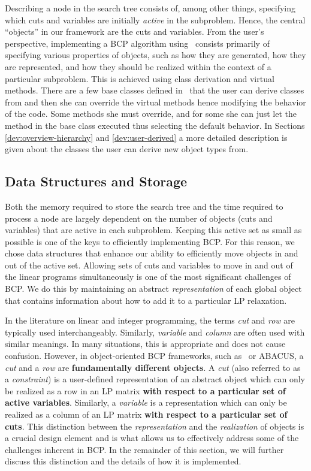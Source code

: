 Describing a node in the search tree consists of, among other things,
specifying which cuts and variables are initially {\em active} in the
subproblem. Hence, the central ``objects'' in our framework
are the cuts and variables. From the user's perspective, implementing
a BCP algorithm using \BB\ consists primarily of specifying
various properties of objects, such as how they are generated, how
they are represented, and how they should be realized within the
context of a particular subproblem. This is achieved using class derivation
and virtual methods. There are a few base classes defined in \BB\ that the
user can derive classes from and then she can override the virtual methods
hence modifying the behavior of the code. Some methods she must override, and
for some she can just let the method in the base class executed thus selecting
the default behavior. 
In Sections \ref{dev:overview-hierarchy} and \ref{dev:user-derived} a more
detailed 
description is given about the classes the user can derive new object types
from. 

\subsection{Data Structures and Storage}
\label{data-structures}

Both the memory required to store the search tree and the time
required to process a node are largely dependent on the number of
objects (cuts and variables) that are active in each subproblem.
Keeping this active set as small as possible is one of the keys to
efficiently implementing BCP. For this reason, we chose data
structures that enhance our ability to efficiently move objects in and
out of the active set. Allowing sets of cuts and variables to move in
and out of the linear programs simultaneously is one of the most
significant challenges of BCP. We do this by maintaining an abstract
{\em representation} of each global object that contains information
about how to add it to a particular LP relaxation. 

In the literature on linear and integer programming, the terms {\em
cut} and {\em row} are typically used interchangeably. Similarly, {\em
variable} and {\em column} are often used with similar meanings. In
many situations, this is appropriate and does not cause confusion.
However, in object-oriented BCP frameworks, such as \BB\ or ABACUS,
a {\em cut} and a {\em row} are {\bf fundamentally different objects}. 
A {\em cut} (also referred to as a {\em
constraint}) is a user-defined representation of an abstract object
which can only be realized as a row in an LP matrix {\bf with respect
to a particular set of active variables}. Similarly, a {\em variable}
is a representation which can only be realized as a column of an LP
matrix {\bf with respect to a particular set of cuts}. This
distinction between the {\em representation} and the {\em realization}
of objects is a crucial design element and is what allows us to
effectively address some of the challenges inherent in BCP. In the
remainder of this section, we will further discuss this distinction
and the details of how it is implemented.


